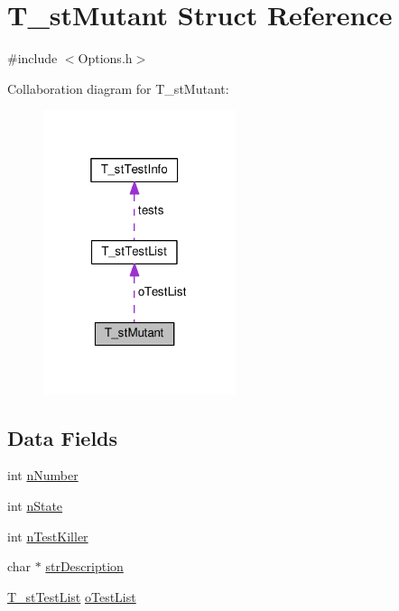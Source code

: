 \hypertarget{structT__stMutant}{\section{T\-\_\-st\-Mutant Struct Reference}
\label{structT__stMutant}
}


{\ttfamily \#include $<$Options.\-h$>$}



Collaboration diagram for T\-\_\-st\-Mutant\-:\nopagebreak
\begin{figure}[H]
\begin{center}
\leavevmode
\includegraphics[width=160pt]{structT__stMutant__coll__graph}
\end{center}
\end{figure}
\subsection*{Data Fields}
\begin{DoxyCompactItemize}
\item 
int \hyperlink{structT__stMutant_aa786929cdfa4a262bb6d760443b3025d}{n\-Number}
\item 
int \hyperlink{structT__stMutant_ada5890ac8d2defb9096bc5dcef0965ee}{n\-State}
\item 
int \hyperlink{structT__stMutant_a4e9fc72bb0ca2c52d21f7622514b0106}{n\-Test\-Killer}
\item 
char $\ast$ \hyperlink{structT__stMutant_a0593f27426124cd3d47d8e032b08d56e}{str\-Description}
\item 
\hyperlink{structT__stTestList}{T\-\_\-st\-Test\-List} \hyperlink{structT__stMutant_a526593dc889002d1c2cd1ee66c9b6325}{o\-Test\-List}
\end{DoxyCompactItemize}


